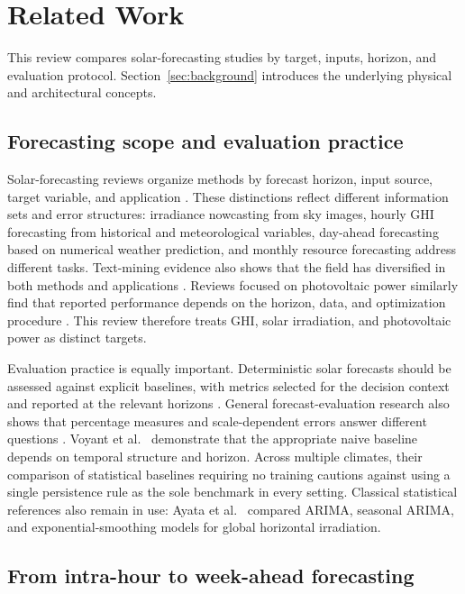 \section{Related Work}
\label{sec:related_work}

This review compares solar-forecasting studies by target, inputs, horizon,
and evaluation protocol. Section~\ref{sec:background} introduces the
underlying physical and architectural concepts.

\subsection{Forecasting scope and evaluation practice}

Solar-forecasting reviews organize methods by forecast horizon, input
source, target variable, and application
\cite{diagne2013,inman2013,antonanzas2016,voyant2017}. These distinctions
reflect different information sets and error structures: irradiance
nowcasting from sky images, hourly GHI forecasting from historical and
meteorological variables, day-ahead forecasting based on numerical weather
prediction, and monthly resource forecasting address different tasks.
Text-mining evidence also shows that the field has diversified in both
methods and applications \cite{yang2018}. Reviews focused on photovoltaic
power similarly find that reported performance depends on the horizon,
data, and optimization procedure \cite{ahmed2020}. This review therefore
treats GHI, solar irradiation, and photovoltaic power as distinct targets.

Evaluation practice is equally important. Deterministic solar forecasts
should be assessed against explicit baselines, with metrics selected for the
decision context and reported at the relevant horizons
\cite{yang2020verification}. General forecast-evaluation research also shows
that percentage measures and scale-dependent errors answer different
questions \cite{hyndman2006}. Voyant et al.\ \cite{voyant2022} demonstrate
that the appropriate naive baseline depends on temporal structure and
horizon. Across multiple climates, their comparison of statistical baselines
requiring no training cautions against using a single persistence rule as
the sole benchmark in every setting. Classical statistical references also
remain in use: Ayata et al.\ \cite{ayata2026arima} compared ARIMA, seasonal
ARIMA, and exponential-smoothing models for global horizontal irradiation.

\subsection{From intra-hour to week-ahead forecasting}

